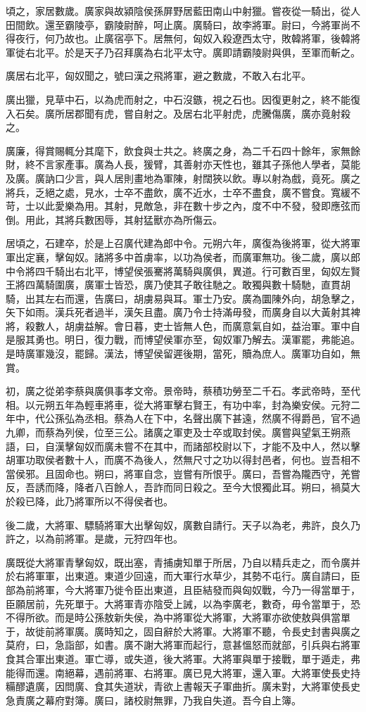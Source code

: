 頃之，家居數歲。廣家與故潁陰侯孫屏野居藍田南山中射獵。嘗夜從一騎出，從人田間飲。還至霸陵亭，霸陵尉醉，呵止廣。廣騎曰，故李將軍。尉曰，今將軍尚不得夜行，何乃故也。止廣宿亭下。居無何，匈奴入殺遼西太守，敗韓將軍，後韓將軍徙右北平。於是天子乃召拜廣為右北平太守。廣即請霸陵尉與俱，至軍而斬之。

廣居右北平，匈奴聞之，號曰漢之飛將軍，避之數歲，不敢入右北平。

廣出獵，見草中石，以為虎而射之，中石沒鏃，視之石也。因復更射之，終不能復入石矣。廣所居郡聞有虎，嘗自射之。及居右北平射虎，虎騰傷廣，廣亦竟射殺之。

廣廉，得賞賜輒分其麾下，飲食與士共之。終廣之身，為二千石四十餘年，家無餘財，終不言家產事。廣為人長，猨臂，其善射亦天性也，雖其子孫他人學者，莫能及廣。廣訥口少言，與人居則畫地為軍陳，射闊狹以飲。專以射為戲，竟死。廣之將兵，乏絕之處，見水，士卒不盡飲，廣不近水，士卒不盡食，廣不嘗食。寬緩不苛，士以此愛樂為用。其射，見敵急，非在數十步之內，度不中不發，發即應弦而倒。用此，其將兵數困辱，其射猛獸亦為所傷云。

居頃之，石建卒，於是上召廣代建為郎中令。元朔六年，廣復為後將軍，從大將軍軍出定襄，擊匈奴。諸將多中首虜率，以功為侯者，而廣軍無功。後二歲，廣以郎中令將四千騎出右北平，博望侯張騫將萬騎與廣俱，異道。行可數百里，匈奴左賢王將四萬騎圍廣，廣軍士皆恐，廣乃使其子敢往馳之。敢獨與數十騎馳，直貫胡騎，出其左右而還，告廣曰，胡虜易與耳。軍士乃安。廣為圜陳外向，胡急擊之，矢下如雨。漢兵死者過半，漢矢且盡。廣乃令士持滿毋發，而廣身自以大黃射其裨將，殺數人，胡虜益解。會日暮，吏士皆無人色，而廣意氣自如，益治軍。軍中自是服其勇也。明日，復力戰，而博望侯軍亦至，匈奴軍乃解去。漢軍罷，弗能追。是時廣軍幾沒，罷歸。漢法，博望侯留遲後期，當死，贖為庶人。廣軍功自如，無賞。

初，廣之從弟李蔡與廣俱事孝文帝。景帝時，蔡積功勞至二千石。孝武帝時，至代相。以元朔五年為輕車將車，從大將軍擊右賢王，有功中率，封為樂安侯。元狩二年中，代公孫弘為丞相。蔡為人在下中，名聲出廣下甚遠，然廣不得爵邑，官不過九卿，而蔡為列侯，位至三公。諸廣之軍吏及士卒或取封侯。廣嘗與望氣王朔燕語，曰，自漢擊匈奴而廣未嘗不在其中，而諸部校尉以下，才能不及中人，然以擊胡軍功取侯者數十人，而廣不為後人，然無尺寸之功以得封邑者，何也。豈吾相不當侯邪。且固命也。朔曰，將軍自念，豈嘗有所恨乎。廣曰，吾嘗為隴西守，羌嘗反，吾誘而降，降者八百餘人，吾詐而同日殺之。至今大恨獨此耳。朔曰，禍莫大於殺已降，此乃將軍所以不得侯者也。

後二歲，大將軍、驃騎將軍大出擊匈奴，廣數自請行。天子以為老，弗許，良久乃許之，以為前將軍。是歲，元狩四年也。

廣既從大將軍青擊匈奴，既出塞，青捕虜知單于所居，乃自以精兵走之，而令廣并於右將軍軍，出東道。東道少回遠，而大軍行水草少，其勢不屯行。廣自請曰，臣部為前將軍，今大將軍乃徙令臣出東道，且臣結發而與匈奴戰，今乃一得當單于，臣願居前，先死單于。大將軍青亦陰受上誡，以為李廣老，數奇，毋令當單于，恐不得所欲。而是時公孫敖新失侯，為中將軍從大將軍，大將軍亦欲使敖與俱當單于，故徙前將軍廣。廣時知之，固自辭於大將軍。大將軍不聽，令長史封書與廣之莫府，曰，急詣部，如書。廣不謝大將軍而起行，意甚慍怒而就部，引兵與右將軍食其合軍出東道。軍亡導，或失道，後大將軍。大將軍與單于接戰，單于遁走，弗能得而還。南絕幕，遇前將軍、右將軍。廣已見大將軍，還入軍。大將軍使長史持糒醪遺廣，因問廣、食其失道狀，青欲上書報天子軍曲折。廣未對，大將軍使長史急責廣之幕府對簿。廣曰，諸校尉無罪，乃我自失道。吾今自上簿。

